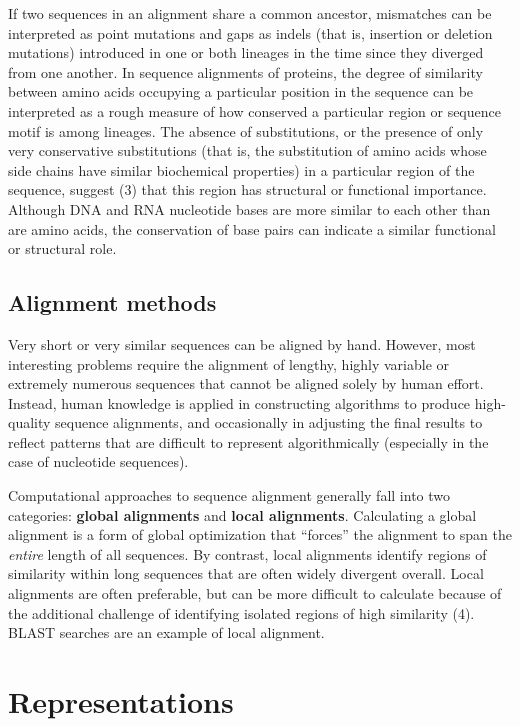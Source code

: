 \documentclass[
]{book}
\begin{document}
If two sequences in an alignment share a common ancestor, mismatches can be interpreted as point mutations and gaps as indels (that is, insertion or deletion mutations) introduced in one or both lineages in the time since they diverged from one another. In sequence alignments of proteins, the degree of similarity between amino acids occupying a particular position in the sequence can be interpreted as a rough measure of how conserved a particular region or sequence motif is among lineages. The absence of substitutions, or the presence of only very conservative substitutions (that is, the substitution of amino acids whose side chains have similar biochemical properties) in a particular region of the sequence, suggest (3) that this region has structural or functional importance. Although DNA and RNA nucleotide bases are more similar to each other than are amino acids, the conservation of base pairs can indicate a similar functional or structural role.

\hypertarget{alignment-methods}{%
\subsection{Alignment methods}\label{alignment-methods}}

Very short or very similar sequences can be aligned by hand. However, most interesting problems require the alignment of lengthy, highly variable or extremely numerous sequences that cannot be aligned solely by human effort. Instead, human knowledge is applied in constructing algorithms to produce high-quality sequence alignments, and occasionally in adjusting the final results to reflect patterns that are difficult to represent algorithmically (especially in the case of nucleotide sequences).

Computational approaches to sequence alignment generally fall into two categories: \textbf{global alignments} and \textbf{local alignments}. Calculating a global alignment is a form of global optimization that ``forces'' the alignment to span the \emph{entire} length of all sequences. By contrast, local alignments identify regions of similarity within long sequences that are often widely divergent overall. Local alignments are often preferable, but can be more difficult to calculate because of the additional challenge of identifying isolated regions of high similarity (4). BLAST searches are an example of local alignment.

\hypertarget{representations}{%
\section{Representations}\label{representations}}
\end{document}
